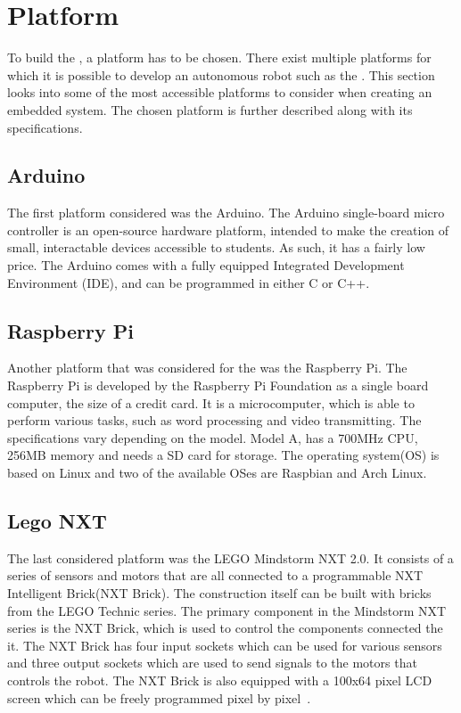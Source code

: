 \section{Platform} \label{sec:platform}
To build the \projname{}, a platform has to be chosen. There exist multiple platforms for which it is possible to develop an autonomous robot such as the \projname{}. This section looks into some of the most accessible platforms to consider when creating an embedded system. The chosen platform is further described along with its specifications.

\subsection{Arduino}
The first platform considered was the Arduino. The Arduino single-board micro controller is an open-source hardware platform, intended to make the creation of small, interactable devices accessible to students. As such, it has a fairly low price. The Arduino comes with a fully equipped Integrated Development Environment (IDE), and can be programmed in either C or C++\citep{arduino}.

\subsection{Raspberry Pi}
Another platform that was considered for the \projname{} was the Raspberry Pi. The Raspberry Pi is developed by the Raspberry Pi Foundation as a single board computer, the size of a credit card. It is a microcomputer, which is able to perform various tasks, such as word processing and video transmitting. The specifications vary depending on the model. Model A, has a 700MHz CPU, 256MB memory and needs a SD card for storage. The operating system(OS) is based on Linux and two of the available OSes are Raspbian and Arch Linux\citep{raspberry_pi}.

\subsection{Lego NXT} \label{sec:lego_nxt}
The last considered platform was the LEGO Mindstorm NXT 2.0. It consists of a series of sensors and motors that are all connected to a programmable NXT Intelligent Brick(NXT Brick). The construction itself can be built with bricks from the LEGO Technic series. The primary component in the Mindstorm NXT series is the NXT Brick, which is used to control the components connected the it. The NXT Brick has four input sockets which can be used for various sensors and three output sockets which are used to send signals to the motors that controls the robot. The NXT Brick is also equipped with a 100x64 pixel LCD screen which can be freely programmed pixel by pixel~\citep{lego_nxt_2.0}.


